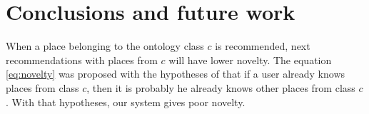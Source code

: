 \section{Conclusions and future work} \label{section:conclu}

When a place belonging to the ontology class $c$ is recommended, next recommendations with places from $c$ will have lower novelty. The equation \ref{eq:novelty} was proposed with the hypotheses of that if a user already knows places from class $c$, then it is probably he already knows other places from class $c$. With that hypotheses, our system gives poor novelty.